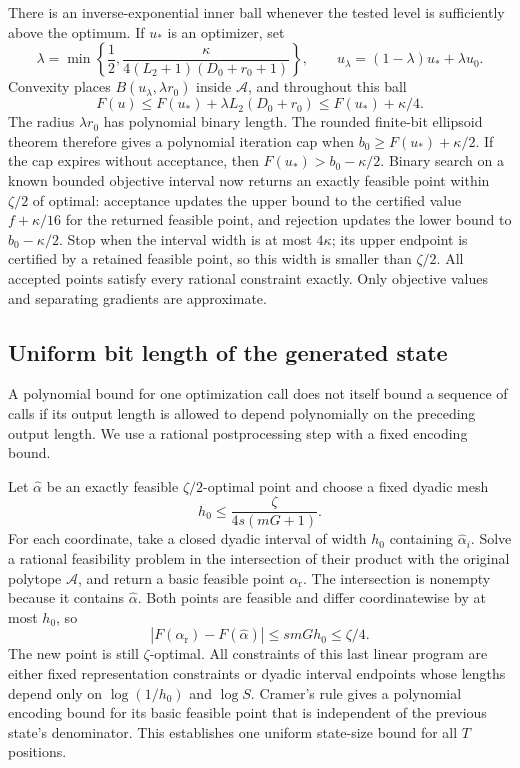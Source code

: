 \documentclass[11pt]{article}
\theoremstyle{definition}
\theoremstyle{remark}
\begin{document}
There is an inverse-exponential inner ball whenever the tested level is sufficiently above the optimum. If $u_*$ is an optimizer, set
\[
\lambda=\min\!\left\{\frac12,
\frac{\kappa}{4(L_2+1)(D_0+r_0+1)}\right\},
\qquad u_\lambda=(1-\lambda)u_*+\lambda u_0.
\]
Convexity places $B(u_\lambda,\lambda r_0)$ inside $\mathcal A$, and throughout this ball
\[
F(u)\le F(u_*)+\lambda L_2(D_0+r_0)
\le F(u_*)+\kappa/4.
\]
The radius $\lambda r_0$ has polynomial binary length. The rounded finite-bit ellipsoid theorem therefore gives a polynomial iteration cap when $b_0\ge F(u_*)+\kappa/2$. If the cap expires without acceptance, then $F(u_*)>b_0-\kappa/2$. Binary search on a known bounded objective interval now returns an exactly feasible point within $\zeta/2$ of optimal: acceptance updates the upper bound to the certified value $f+\kappa/16$ for the returned feasible point, and rejection updates the lower bound to $b_0-\kappa/2$. Stop when the interval width is at most $4\kappa$; its upper endpoint is certified by a retained feasible point, so this width is smaller than $\zeta/2$. All accepted points satisfy every rational constraint exactly. Only objective values and separating gradients are approximate.

\subsection{Uniform bit length of the generated state}

A polynomial bound for one optimization call does not itself bound a sequence of calls if its output length is allowed to depend polynomially on the preceding output length. We use a rational postprocessing step with a fixed encoding bound.

Let $\widehat\alpha$ be an exactly feasible $\zeta/2$-optimal point and choose a fixed dyadic mesh
\[
h_0\le\frac{\zeta}{4s(mG+1)}.
\]
For each coordinate, take a closed dyadic interval of width $h_0$ containing $\widehat\alpha_i$. Solve a rational feasibility problem in the intersection of their product with the original polytope $\mathcal A$, and return a basic feasible point $\alpha_{\mathrm r}$. The intersection is nonempty because it contains $\widehat\alpha$. Both points are feasible and differ coordinatewise by at most $h_0$, so
\[
|F(\alpha_{\mathrm r})-F(\widehat\alpha)|
\le smG h_0\le\zeta/4.
\]
The new point is still $\zeta$-optimal. All constraints of this last linear program are either fixed representation constraints or dyadic interval endpoints whose lengths depend only on $\log(1/h_0)$ and $\log S$. Cramer's rule gives a polynomial encoding bound for its basic feasible point that is independent of the previous state's denominator. This establishes one uniform state-size bound for all $T$ positions.
\end{document}
